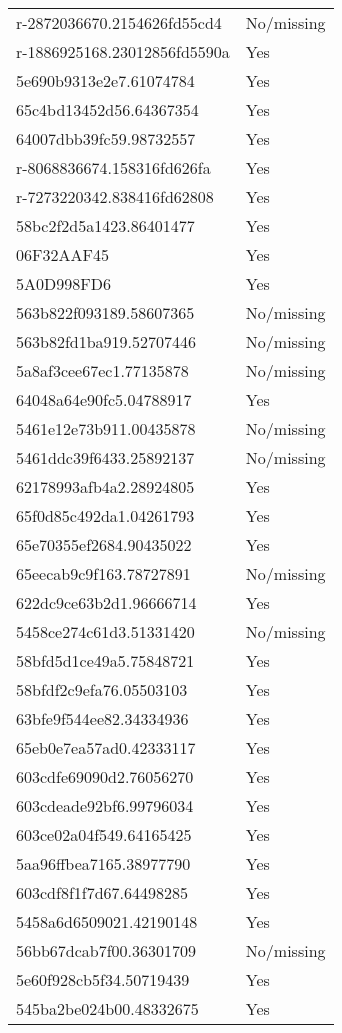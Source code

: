 \begin{tabular}{ll}
r-2872036670.2154626fd55cd4 & No/missing \\
r-1886925168.23012856fd5590a & Yes \\
5e690b9313e2e7.61074784 & Yes \\
65c4bd13452d56.64367354 & Yes \\
64007dbb39fc59.98732557 & Yes \\
r-8068836674.158316fd626fa & Yes \\
r-7273220342.838416fd62808 & Yes \\
58bc2f2d5a1423.86401477 & Yes \\
06F32AAF45 & Yes \\
5A0D998FD6 & Yes \\
563b822f093189.58607365 & No/missing \\
563b82fd1ba919.52707446 & No/missing \\
5a8af3cee67ec1.77135878 & No/missing \\
64048a64e90fc5.04788917 & Yes \\
5461e12e73b911.00435878 & No/missing \\
5461ddc39f6433.25892137 & No/missing \\
62178993afb4a2.28924805 & Yes \\
65f0d85c492da1.04261793 & Yes \\
65e70355ef2684.90435022 & Yes \\
65eecab9c9f163.78727891 & No/missing \\
622dc9ce63b2d1.96666714 & Yes \\
5458ce274c61d3.51331420 & No/missing \\
58bfd5d1ce49a5.75848721 & Yes \\
58bfdf2c9efa76.05503103 & Yes \\
63bfe9f544ee82.34334936 & Yes \\
65eb0e7ea57ad0.42333117 & Yes \\
603cdfe69090d2.76056270 & Yes \\
603cdeade92bf6.99796034 & Yes \\
603ce02a04f549.64165425 & Yes \\
5aa96ffbea7165.38977790 & Yes \\
603cdf8f1f7d67.64498285 & Yes \\
5458a6d6509021.42190148 & Yes \\
56bb67dcab7f00.36301709 & No/missing \\
5e60f928cb5f34.50719439 & Yes \\
545ba2be024b00.48332675 & Yes \\

\end{tabular}
